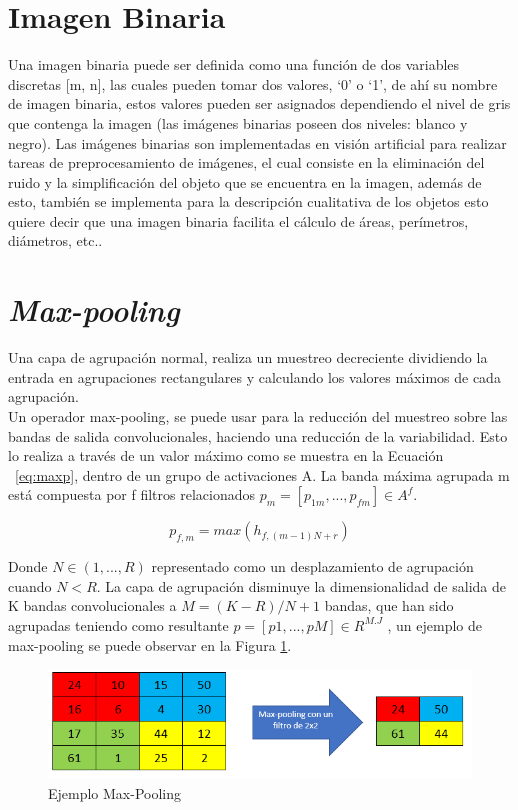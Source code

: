 \section{Imagen Binaria} Una imagen binaria puede ser definida como una función de dos variables discretas
[m, n], las cuales pueden tomar dos valores, ‘0’ o ‘1’, de ahí su nombre de imagen binaria, estos valores pueden ser asignados dependiendo el nivel de gris que contenga la imagen (las imágenes binarias poseen dos niveles: blanco y negro). Las imágenes binarias son implementadas en visión artificial para realizar tareas de preprocesamiento de imágenes, el cual consiste en la eliminación del ruido y la simplificación del objeto que se encuentra en la imagen, además de esto, también se implementa para la descripción cualitativa de los objetos esto quiere decir que una imagen binaria facilita el cálculo de áreas, perímetros, diámetros, etc.\cite{ref_12}.

\section{\textit{Max-pooling}}

Una capa de agrupación normal, realiza un muestreo decreciente dividiendo la entrada en agrupaciones rectangulares y calculando los valores máximos de cada agrupación.\\

Un operador max-pooling, se puede usar para la reducción del muestreo sobre las bandas de salida convolucionales, haciendo una reducción de la variabilidad. Esto lo realiza a través de un valor máximo como se muestra en la Ecuación ~\ref{eq:maxp}, dentro de un grupo de activaciones A. La banda máxima agrupada m está compuesta por f filtros relacionados $p_{m}=[p_{1m},...,p_{fm}] \in A^f$.

\begin{equation}
	\label{eq:maxp}
	p_{f,m}=max(h_{f,(m-1)N+r})
\end{equation}

Donde $N \in (1,...,R) $ representado como un desplazamiento de agrupación cuando $N < R$. La capa de agrupación disminuye la dimensionalidad de salida de K bandas convolucionales a $M=(K-R)/N+1$ bandas, que han sido agrupadas teniendo como resultante $p=[p1,...,pM] \in R^{M.J}$ \cite{gholamalinezhad2020pooling}, un ejemplo de max-pooling se puede observar en la Figura \ref{mp}.

\begin{figure}[ht]
	\centering
	\includegraphics[scale=0.6]{Figs/mp.png}
	\caption{Ejemplo Max-Pooling}
	\label{mp}
\end{figure}




